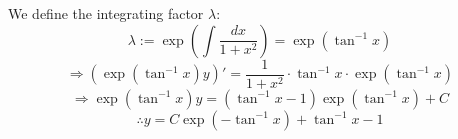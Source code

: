\item

We define the integrating factor $\lambda$:
\[
	\lambda := \exp \left( \int \frac{dx}{1 + x^2} \right) = \exp \left( \tan^{-1} x \right)
\]
\[
	\Rightarrow \left( \exp \left( \tan^{-1} x \right) y \right)'
	= \frac{1}{1 + x^2} \cdot \tan^{-1} x \cdot \exp \left( \tan^{-1} x \right)
\]
\[
	\Rightarrow \exp \left( \tan^{-1} x \right) y
	= \left( \tan^{-1}x - 1 \right) \exp \left( \tan^{-1} x \right) + C
\]
\[
	\therefore y = C \exp \left( -\tan^{-1} x \right) + \tan^{-1} x - 1
\]